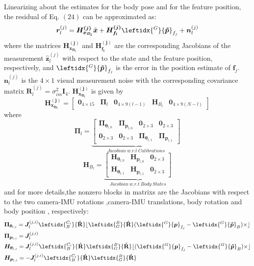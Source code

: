 \documentclass[a4paper, 10pt, conference]{ieeeconf}      %
\begin{document}
Linearizing about the estimates for the body pose and
for the feature position, the residual of Eq. $ (24) $ can be approximated as:
\begin{equation}
\bm {r}_l^{(j)} =\bm{H_{x_{B_l}}^{(j)}}{\tilde {\bm x}}+\bm{H_{f_{l}}^{(j)}}{\leftidx{^{G}}{\bm {\tilde p}}_{f_{j}}}+{\bm n_l^{(j)}}
\end{equation}
where the matrices $ \bm{H_{x_{B_l}}^{(j)}} $ and $ \bm{H_{f_{l}}^{(j)}} $ are the corresponding Jacobians of the measurement $  \bm {\hat z}_{l}^{(j)} $ with respect to the state and the
feature position, respectively, and $ {\leftidx{^{G}}{\bm {\tilde p}}_{f_{j}}} $ is the error in the
position estimate of $ \bm f_j $. $ \bm n_l^{(j)} $ is the $ 4 \times 1 $ visual measurement noise with the corresponding  covariance matrix  $ \bm R_l^{(j)} = {\sigma}_{im}^2 \bm I_4 $. $ \bm{H_{x_{B_l}}^{(j)}} $ is given by
\begin{equation}
 \bm{H_{x_{B_l}}^{(j)}}=\left[\begin{matrix} \bm 0_{4 \times 15} & \bm {\Pi}_l & \bm 0_{4 \times 9(l-1)} & \bm H_{B_l} & \bm 0_{4 \times 9(N-l)}
 \end{matrix} \right] 
\end{equation}
where
\begin{equation}
\bm {\Pi}_l = \underbrace{ \left[\begin{matrix}
 \bm {\Pi}_{\bm {\theta}_{l,0}} & \bm {\Pi}_{\bm {p}_{l,0}} & \bm 0_{2 \times 3}  & \bm 0_{2 \times 3} \\ 
  \bm 0_{2 \times 3}  & \bm 0_{2 \times 3} & \bm {\Pi}_{\bm {\theta}_{l,1}} & \bm {\Pi}_{\bm {p}_{l,1}} 
\end{matrix} \right] }_{Jacobian \ w.r.t \ Calibrations } 
\end{equation}
\begin{equation}
\bm H_{B_l} = \underbrace{ \left[\begin{matrix}
 \bm {H}_{\bm {\theta}_{l,0}} & \bm {H}_{\bm {p}_{l,0}} & \bm 0_{2 \times 3}\\ 
  \bm {H}_{\bm {\theta}_{l,1}} & \bm {H}_{\bm {p}_{l,1}} & \bm 0_{2 \times 3}
\end{matrix} \right]  }_{ Jacobian \ w.r.t \ Body \ States} 
\end{equation}
and for more details,the nonzero blocks in matrixs are  the Jacobians with respect to  the two camera-IMU rotations ,camera-IMU translations,  body rotation  and body position , respectively:
\begin{align}
&\bm {\Pi}_{\bm {\theta}_{l,i}} = \bm J_l^{(j,i)} \leftidx{_B^{C_i}}{\hat {\textbf R}}  \lfloor \leftidx{_G^B}{\hat {\textbf R}} (\leftidx{^{G}}{\bm { p}}_{f_{j}}-\leftidx{^{G}}{\bm {\tilde p}}_B)\times \rfloor \\ 
&\bm {\Pi}_{\bm {p}_{l,i}}  = \bm J_l^{(j,i)} \\
& \bm {H}_{\bm {\theta}_{l,i}}  = \bm J_l^{(j,i)}  \leftidx{_B^{C_i}}{\hat {\textbf R}} \leftidx{_G^B}{\hat {\textbf R}} \lfloor (\leftidx{^{G}}{\bm { p}}_{f_{j}}-\leftidx{^{G}}{\bm {\tilde p}}_B)\times \rfloor \\ 
& \bm {H}_{\bm {p}_{l,i}}  = -\bm J_l^{(j,i)} \leftidx{_B^{C_i}}{\hat {\textbf R}} \leftidx{_G^B}{\hat {\textbf R}}
\end{align}
\end{document}
